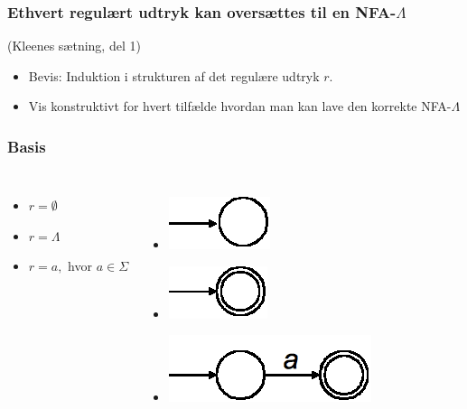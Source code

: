 \begin{frame}
\frametitle{Ethvert regulært udtryk kan oversættes til en NFA-$\Lambda$}
(Kleenes sætning, del 1)
\begin{itemize}
\item Bevis:
  Induktion i strukturen af det regulære udtryk $r$.
\item
Vis konstruktivt for hvert tilfælde hvordan man kan lave den korrekte NFA-$\Lambda$
\end{itemize}
\end{frame}
\begin{frame}
\frametitle{Basis}
\begin{columns}
\column{5cm}
\begin{itemize}
\item 
$r=\emptyset$
\item $r=\Lambda$
\item $r=a,$ hvor $a\in\Sigma$
\end{itemize}
\column{5cm}
\begin{itemize}[<+->]
\item
\includegraphics[scale=0.4]{images/2_seminar_basis_emptyset}
\item
\includegraphics[scale=0.4]{images/2_seminar_basis_lambda}
\item
\includegraphics[scale=0.4]{images/2_seminar_basis_a}
\end{itemize}
\end{columns}
\end{frame}
